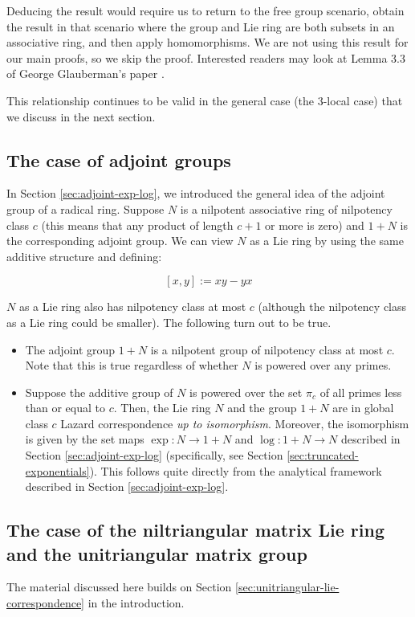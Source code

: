 Deducing the result would require us to return to the free group
scenario, obtain the result in that scenario where the group and Lie
ring are both subsets in an associative ring, and then apply
homomorphisms. We are not using this result for our main proofs, so we
skip the proof. Interested readers may look at Lemma 3.3 of
George Glauberman's paper \cite{Partialextensions}.

This relationship continues to be valid in the general case (the
$3$-local case) that we discuss in the next section.

\subsection{The case of adjoint groups}\label{sec:adjoint-lazard}

In Section \ref{sec:adjoint-exp-log}, we introduced the general idea
of the adjoint group of a radical ring. Suppose $N$ is a nilpotent
associative ring of nilpotency class $c$ (this means that any product
of length $c + 1$ or more is zero) and $1 + N$ is the corresponding
adjoint group. We can view $N$ as a Lie ring by using the same
additive structure and defining:

$$[x,y] := xy - yx$$

$N$ as a Lie ring also has nilpotency class at most $c$ (although the
nilpotency class as a Lie ring could be smaller). The following turn
out to be true.

\begin{itemize}
\item The adjoint group $1 + N$ is a nilpotent group of nilpotency
  class at most $c$. Note that this is true regardless of whether $N$
  is powered over any primes.
\item Suppose the additive group of $N$ is powered over the set
  $\pi_c$ of all primes less than or equal to $c$. Then, the Lie ring
  $N$ and the group $1 + N$ are in global class $c$ Lazard
  correspondence {\em up to isomorphism}. Moreover, the isomorphism is
  given by the set maps $\exp:N \to 1 + N$ and $\log: 1 + N \to N$
  described in Section \ref{sec:adjoint-exp-log} (specifically, see
  Section \ref{sec:truncated-exponentials}). This follows quite
  directly from the analytical framework described in Section
  \ref{sec:adjoint-exp-log}.
\end{itemize}

\subsection{The case of the niltriangular matrix Lie ring and the unitriangular matrix group}\label{sec:unitriangular-lazard}
The material discussed here builds on Section
\ref{sec:unitriangular-lie-correspondence} in the introduction.

